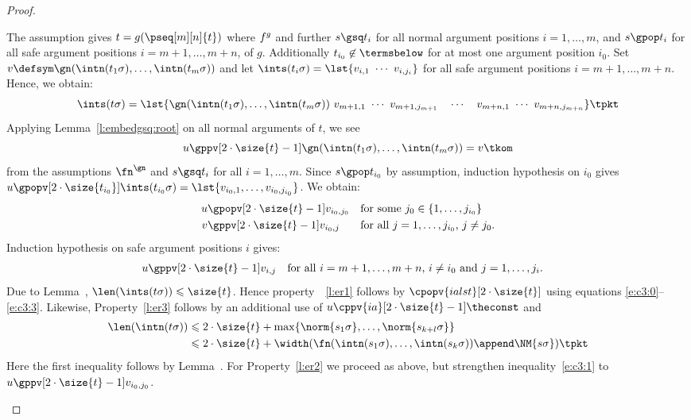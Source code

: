 \documentclass{LMCS}
\begin{document}
\begin{proof}
\begin{description}[leftmargin=0.3cm]
  \item[\dcase{$s \cpop{ia} t$}]
    The assumption gives $t = g(\pseq[m][n]{t})$ where $f \sp g$
    and further $s \gsq t_i$ for all normal argument positions $i = 1,\dots,m$, and
    $s \gpop t_i$ for all safe argument positions $i = m+1,\dots,m+n$, of $g$. 
    Additionally $t_{i_0} \not\in \termsbelow$ for at most one argument position $i_0$.
Set $v \defsym \gn(\intn(t_1\sigma), \dots, \intn(t_m\sigma))$ and 
    let $\ints(t_i\sigma) = \lst{v_{i,1}~\cdots~v_{i,j_i}}$ for all safe argument positions 
    $i = m+1,\dots,m+n$. Hence, we obtain:
\begin{equation*}
    \ints(t\sigma) =  \lst{\gn(\intn(t_1\sigma), \dots, \intn(t_m\sigma))~v_{m+1,1}~\cdots~v_{m+1,j_{m+1}}\quad\cdots\quad v_{m+n,1}~\cdots~v_{m+n,j_{m+n}}} \tpkt
    \end{equation*}
    Applying Lemma~\ref{l:embedgsq:root} on all normal arguments of $t$, we see
    \begin{equation}
      \label{e:c3:0}
      u \gppv[2\cdot\size{t} - 1] \gn(\intn(t_1\sigma), \dots, \intn(t_m\sigma)) = v
      \tkom
    \end{equation}
    from the assumptions $\fn \sp \gn$ and $s \gsq t_i$ for all $i = 1,\dots,m$.
    Since $s \gpop t_{i_0}$ by assumption, induction hypothesis on $i_0$ gives 
${u} \gpopv[2\cdot \size{t_{i_0}}] {\ints(t_{i_0}\sigma)} = 
    {\lst{v_{i_0,1}, \dots, v_{i_0,j_{i_0}}}}$.
We obtain:
\begin{align}
      u & \gpopv[2\cdot\size{t}-1] {v_{i_0,j_0}} 
      && \text{for some $j_0 \in \{1,\dots,j_{i_0}\}$}\label{e:c3:1}\\
      v & \gppv[2\cdot\size{t}-1] {v_{i_0,j}} 
      && \text{for all $j = 1,\dots,j_{i_0}$, $j \not=j_0$.}\label{e:c3:2}
    \end{align}
Induction hypothesis on safe argument positions $i$ gives:
\begin{align}
      u & \gppv[2\cdot\size{t}-1] {v_{i,j}} 
      && \text{for all $i = m+1,\dots,m+n$, $i \not=i_0$ and $j = 1,\dots,j_{i}$.} \label{e:c3:3}
    \end{align}
Due to Lemma~, $\len(\ints(t\sigma)) \leqslant \size{t}$. 
Hence property~~\ref{l:er1} follows by $\cpopv{ialst}[2\cdot\size{t}]$
using equations \eqref{e:c3:0}--\eqref{e:c3:3}.
Likewise, Property~\ref{l:er3} follows by an additional use of
$u \cppv{ia}[2\cdot\size{t}-1] \theconst$ and
    \begin{align*}
      \len(\intn(t\sigma)) 
      & \leqslant 2\cdot\size{t} + \max \{ \norm{s_1\sigma}, \dots, \norm{s_{k+l}\sigma}\}
      \\
      & \leqslant 2\cdot\size{t} + \width(\fn(\intn(s_1\sigma), \dots, \intn(s_k\sigma)) \append \NM{s\sigma}) \tpkt
    \end{align*}
Here the first inequality follows by Lemma~.
For Property~\ref{l:er2} we proceed as above, but strengthen inequality~\eqref{e:c3:1} 
to $u \gppv[2\cdot\size{t}-1] {v_{i_0,j_0}}$.




\end{description}
\end{proof}
\end{document}
